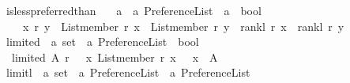 \begin{isabellebody}
\isanewline
{}\isamarkupfalse%
\ is{\isacharunderscore}{\kern0pt}less{\isacharunderscore}{\kern0pt}preferred{\isacharunderscore}{\kern0pt}than\ {\isacharcolon}{\kern0pt}{\isacharcolon}{\kern0pt}\isanewline
\ \ {\isachardoublequoteopen}{\isacharprime}{\kern0pt}a\ {\isasymRightarrow}\ {\isacharprime}{\kern0pt}a\ Preference{\isacharunderscore}{\kern0pt}List\ {\isasymRightarrow}\ {\isacharprime}{\kern0pt}a\ {\isasymRightarrow}\ bool{\isachardoublequoteclose}\ {\isacharparenleft}{\kern0pt}{\isachardoublequoteopen}{\isacharunderscore}{\kern0pt}\ {\isasymlesssim}\isactrlsub {\isacharunderscore}{\kern0pt}\ {\isacharunderscore}{\kern0pt}{\isachardoublequoteclose}\ {\isacharbrackleft}{\kern0pt}{}{}{\isacharcomma}{\kern0pt}\ {}{}{}{}{\isacharcomma}{\kern0pt}\ {}{}{\isacharbrackright}{\kern0pt}\ {}{}{\isacharparenright}{\kern0pt}\ \isanewline
\ \ \ \ {\isachardoublequoteopen}x\ {\isasymlesssim}\isactrlsub r\ y\ {\isacharequal}{\kern0pt}\ {\isacharparenleft}{\kern0pt}{\isacharparenleft}{\kern0pt}List{\isachardot}{\kern0pt}member\ r\ x{\isacharparenright}{\kern0pt}\ {\isasymand}\ {\isacharparenleft}{\kern0pt}List{\isachardot}{\kern0pt}member\ r\ y{\isacharparenright}{\kern0pt}\ {\isasymand}\ {\isacharparenleft}{\kern0pt}rank{\isacharunderscore}{\kern0pt}l\ r\ x\ {\isasymge}\ rank{\isacharunderscore}{\kern0pt}l\ r\ y{\isacharparenright}{\kern0pt}{\isacharparenright}{\kern0pt}{\isachardoublequoteclose}\isanewline
\isanewline
{}\isamarkupfalse%
\ limited\ {\isacharcolon}{\kern0pt}{\isacharcolon}{\kern0pt}\ {\isachardoublequoteopen}{\isacharprime}{\kern0pt}a\ set\ {\isasymRightarrow}\ {\isacharprime}{\kern0pt}a\ Preference{\isacharunderscore}{\kern0pt}List\ {\isasymRightarrow}\ bool{\isachardoublequoteclose}\ \isanewline
\ \ {\isachardoublequoteopen}limited\ A\ r\ {\isasymequiv}\ {\isacharparenleft}{\kern0pt}{\isasymforall}\ x{\isachardot}{\kern0pt}\ {\isacharparenleft}{\kern0pt}List{\isachardot}{\kern0pt}member\ r\ x{\isacharparenright}{\kern0pt}\ {\isasymlongrightarrow}\ \ x\ {\isasymin}\ A{\isacharparenright}{\kern0pt}{\isachardoublequoteclose}\isanewline
\isanewline
{}\isamarkupfalse%
\ limit{\isacharunderscore}{\kern0pt}l\ {\isacharcolon}{\kern0pt}{\isacharcolon}{\kern0pt}\ {\isachardoublequoteopen}{\isacharprime}{\kern0pt}a\ set\ {\isasymRightarrow}\ {\isacharprime}{\kern0pt}a\ Preference{\isacharunderscore}{\kern0pt}List\ {\isasymRightarrow}\ {\isacharprime}{\kern0pt}a\ Preference{\isacharunderscore}{\kern0pt}List{\isachardoublequoteclose}\ \isanewline

\end{isabellebody}
